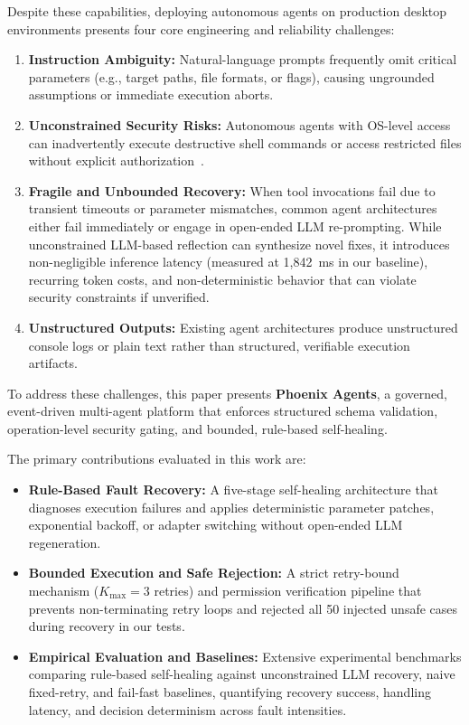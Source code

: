 \documentclass[conference]{IEEEtran}
\begin{document}
Despite these capabilities, deploying autonomous agents on production desktop environments presents four core engineering and reliability challenges:
\begin{enumerate}
    \item \textbf{Instruction Ambiguity:} Natural-language prompts frequently omit critical parameters (e.g., target paths, file formats, or flags), causing ungrounded assumptions or immediate execution aborts.
    \item \textbf{Unconstrained Security Risks:} Autonomous agents with OS-level access can inadvertently execute destructive shell commands or access restricted files without explicit authorization~\cite{bajoria2026}.
    \item \textbf{Fragile and Unbounded Recovery:} When tool invocations fail due to transient timeouts or parameter mismatches, common agent architectures either fail immediately or engage in open-ended LLM re-prompting. While unconstrained LLM-based reflection can synthesize novel fixes, it introduces non-negligible inference latency (measured at 1,842~ms in our baseline), recurring token costs, and non-deterministic behavior that can violate security constraints if unverified.
    \item \textbf{Unstructured Outputs:} Existing agent architectures produce unstructured console logs or plain text rather than structured, verifiable execution artifacts.
\end{enumerate}

To address these challenges, this paper presents \textbf{Phoenix Agents}, a governed, event-driven multi-agent platform that enforces structured schema validation, operation-level security gating, and bounded, rule-based self-healing.

The primary contributions evaluated in this work are:
\begin{itemize}
    \item \textbf{Rule-Based Fault Recovery:} A five-stage self-healing architecture that diagnoses execution failures and applies deterministic parameter patches, exponential backoff, or adapter switching without open-ended LLM regeneration.
    \item \textbf{Bounded Execution and Safe Rejection:} A strict retry-bound mechanism ($K_{\text{max}}=3$ retries) and permission verification pipeline that prevents non-terminating retry loops and rejected all 50 injected unsafe cases during recovery in our tests.
    \item \textbf{Empirical Evaluation and Baselines:} Extensive experimental benchmarks comparing rule-based self-healing against unconstrained LLM recovery, naive fixed-retry, and fail-fast baselines, quantifying recovery success, handling latency, and decision determinism across fault intensities.
\end{itemize}
\end{document}

